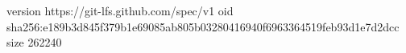 version https://git-lfs.github.com/spec/v1
oid sha256:e189b3d845f379b1e69085ab805b03280416940f6963364519feb93d1e7d2dcc
size 262240
